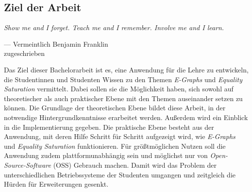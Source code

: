 






\subsection{Ziel der Arbeit}

\vspace{5mm}
\begin{center}
    {\itshape
    \rmfamily
    \glqq Show me and I forget.
    Teach me and I remember. 
    Involve me and I learn.\grqq}
    \vspace{-3mm}
    \begin{flushright}
        \footnotesize
        --- Vermeintlich 
        Benjamin Franklin \\
        zugeschrieben
    \end{flushright}
\end{center}\vspace{3mm}

Das Ziel dieser Bachelorarbeit ist es, eine Anwendung für die Lehre zu entwickeln, die Studentinnen und Studenten Wissen zu den Themen \textit{E-Graphs} und \textit{Equality Saturation}
vermittelt. Dabei sollen sie die Möglichkeit haben, sich sowohl auf theoretischer als auch praktischer Ebene mit den Themen auseinander setzen zu können.
Die Grundlage der theoretischen Ebene bildet diese Arbeit, in der notwendige Hintergrundkenntnisse erarbeitet werden. Außerdem wird ein Einblick in die Implementierung gegeben. 
Die praktische Ebene besteht aus der Anwendung, mit deren Hilfe Schritt für Schritt aufgezeigt wird, wie \textit{E-Graphs} und \textit{Equality Saturation} funktionieren.
Für grö{\ss}tmöglichen Nutzen soll die Anwendung zudem plattformunabhängig sein und möglichst nur von \textit{Open-Source-Software} (OSS) Gebrauch machen.
Damit wird das Problem der unterschiedlichen Betriebssysteme der Studenten umgangen und zeitgleich die Hürden für Erweiterungen gesenkt.

